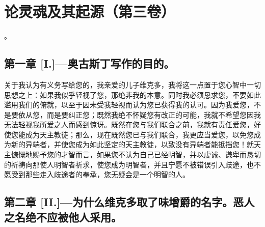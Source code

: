 

\section{论灵魂及其起源（第三卷）}

。\par

\par


\subsection{第一章 [I.]—奥古斯丁写作的目的。}

关于我认为有义务写给您的，我亲爱的儿子维克多，我将这一点置于您心智中一切思想之上：如果我似乎轻视了您，那绝非我的本意。同时我必须恳求您，不要如此滥用我们的俯就，以至于因未受我轻视而认为您已获得我的认可。因为我爱您，不是要依从您，而是要纠正您；既然我绝不怀疑您有改正的可能，我就不希望您因我无法轻视我所爱之人而感到惊讶。既然在您与我们联合之前，我就有责任爱您，好使您能成为天主教徒；那么，现在既然您已与我们联合，我更应当爱您，以免您成为新的异端者，并使您成为如此坚定的天主教徒，以致没有异端者能抵挡您！就天主慷慨地赐予您的才智而言，如果您不认为自己已经明智，并以虔诚、谦卑而恳切的祈祷向那使人明智者祈求，使您成为明智者，并且宁愿不被错误引入歧途，也不愿受到那些走入歧途者的奉承，您无疑会是一个明智的人。\par


\subsection{第二章 [II.]—为什么维克多取了味增爵的名字。恶人之名绝不应被他人采用。}

